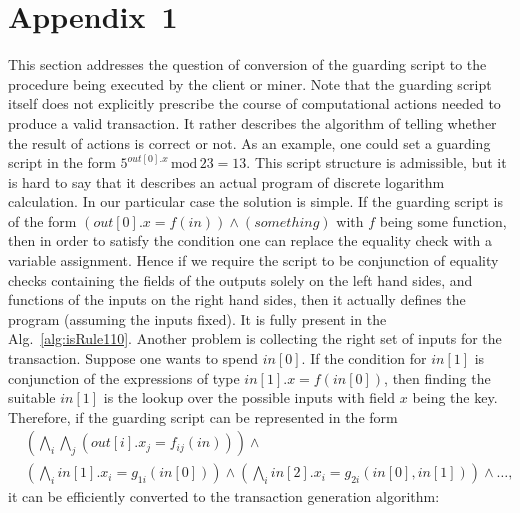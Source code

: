 \documentclass[runningheads]{llncs}
\begin{document}
    \section*{Appendix~1}
    \label{appendix1}
    This section addresses the question of conversion of the guarding script to
    the procedure being executed by the client or miner. Note that the guarding
    script itself does not explicitly prescribe the course of computational
    actions needed to produce a valid transaction. It rather describes the
    algorithm of telling whether the result of actions is correct or not. As an
    example, one could set a guarding script in the form
    $5^{out[0].x}\,\textrm{mod}\, 23 = 13$. This script structure is admissible,
    but it is hard to say that it describes an actual program of discrete
    logarithm calculation. In our particular case the solution is simple. If the
    guarding script is of the form $(out[0].x=f(in))\wedge(something)$ with $f$
    being some function, then in order to satisfy the condition one can replace
    the equality check with a variable assignment. Hence if we require the script
    to be conjunction of equality checks containing the fields of the outputs
    solely on the left hand sides, and functions of the inputs on the right hand
    sides, then it actually defines the program (assuming the inputs fixed). It
    is fully present in the Alg.~\ref{alg:isRule110}. Another problem is collecting the right set
    of inputs for the transaction. Suppose one wants to spend $in[0]$. If the
    condition for $in[1]$ is conjunction of the expressions of type
    $in[1].x=f(in[0])$, then finding the suitable $in[1]$ is the lookup over the
    possible inputs with field $x$ being the key. Therefore, if the guarding
    script can be represented in the form
    \begin{eqnarray}
        \label{eq:scr}
        \nonumber
        &\left(\bigwedge_i\bigwedge_j(out[i].x_j=f_{ij}(in))\right)\wedge \\ 
        &\left(\bigwedge_i in[1].x_i  = g_{1i}(in[0])\right)\wedge
        \left(\bigwedge_i in[2].x_i =
        g_{2i}(in[0],in[1])\right)\wedge\dots,
        \label{eq:convertable}
    \end{eqnarray}
    it can be efficiently converted to the transaction generation algorithm:
\end{document}
